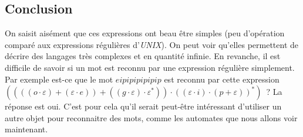 \subsection{Conclusion}

On saisit aisément que ces expressions ont beau être simples (peu d'opération
comparé aux expressions régulières d'\textit{UNIX}). On peut voir qu'elles
permettent de décrire des langages très complexes et en quantité infinie. En
revanche, il est difficile de savoir si un mot est reconnu par une expression
régulière simplement. Par exemple est-ce que le mot \(eipipipipipip\) est
reconnu par cette expression \(((((o \cdot \varepsilon)+(\varepsilon \cdot
e))+((g\cdot \varepsilon) \cdot \varepsilon^*)) \cdot ((\varepsilon \cdot
i)\cdot (p+\varepsilon))^*)\)~? La réponse est oui. C'est pour cela qu'il
serait peut-être intéressant d'utiliser un autre objet pour reconnaitre des
mots, comme les automates que nous allons voir maintenant.
